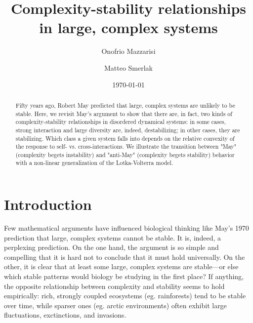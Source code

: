 \documentclass[%
 reprint,
 amsmath,amssymb,
 aps,
]{revtex4-2}
\begin{document}
\title{Complexity-stability relationships in large, complex systems}

\author{Onofrio Mazzarisi}
\author{Matteo Smerlak}



\date{\today}%

\begin{abstract}
Fifty years ago, Robert May predicted that large, complex systems are unlikely to be stable. Here, we revisit May's argument to show that there are, in fact, two kinds of complexity-stability relationships in disordered dynamical systems: in some cases, strong interaction and large diversity are, indeed, destabilizing; in other cases, they are stabilizing. Which class a given system falls into depends on the relative convexity of the response to self- vs. cross-interactions. We illustrate the transition between "May" (complexity begets instability) and "anti-May" (complexity begets stability) behavior with a non-linear  generalization of the Lotka-Volterra model. 
\end{abstract}


\maketitle

\section{Introduction}

Few mathematical arguments have influenced biological thinking like May's 1970 prediction that large, complex systems cannot be stable. It is, indeed, a perplexing prediction. On the one hand, the argument is so simple and compelling that it is hard not to conclude that it must hold universally. On the other, it is clear that at least some large, complex systems are stable---or else which stable patterns would biology be studying in the first place? If anything, the opposite relationship between complexity and stability seems to hold empirically: rich, strongly coupled ecosystems (eg. rainforests) tend to be  stable over time, while sparser ones (eg. arctic environments) often exhibit large fluctuations, exctinctions, and invasions. 
\end{document}

